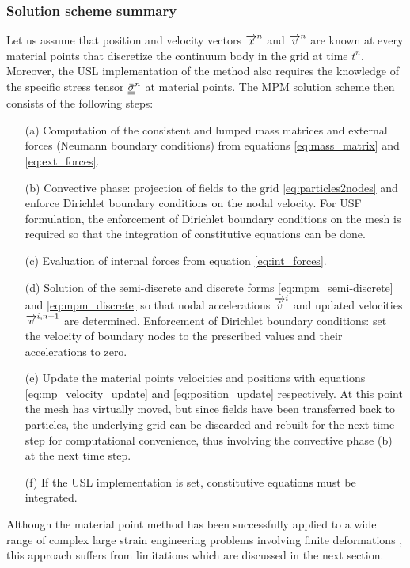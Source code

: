 \subsubsection{Solution scheme summary}
Let us assume that position and velocity vectors  ${\overrightarrow{x}}^n$ and ${\overrightarrow{v}}^n$ are known at every material points that discretize the continuum body in the grid at time $t^n$. Moreover, the USL implementation of the method also requires the knowledge of the specific stress tensor ${\underline{\underline{\bar{\sigma}}}}^n$ at material points. The MPM solution scheme then consists of the following steps:
\begin{itemize}
\item[(a)] Computation of the consistent and lumped mass matrices and external forces (Neumann boundary conditions) from equations \eqref{eq:mass_matrix} and \eqref{eq:ext_forces}.
\item[(b)] Convective phase: projection of fields to the grid \eqref{eq:particles2nodes} and enforce Dirichlet boundary conditions on the nodal velocity. For USF formulation, the enforcement of Dirichlet boundary conditions on the mesh is required so that the integration of constitutive equations can be done.
\item[(c)] Evaluation of internal forces from equation \eqref{eq:int_forces}.
\item[(d)] Solution of the semi-discrete and discrete forms \eqref{eq:mpm_semi-discrete} and \eqref{eq:mpm_discrete} so that nodal accelerations ${\overrightarrow{\dot{v}}}^i$ and updated velocities ${\overrightarrow{v}}^{i,n+1}$ are determined. Enforcement of Dirichlet boundary conditions: set the velocity of boundary nodes to the prescribed values and their accelerations to zero.
\item[(e)] Update the material points velocities and positions with equations \eqref{eq:mp_velocity_update} and \eqref{eq:position_update} respectively. At this point the mesh has virtually moved, but since fields have been transferred back to particles, the underlying grid can be discarded and rebuilt for the next time step for computational convenience, thus involving the convective phase (b) at the next time step. 
\item[(f)] If the USL implementation is set, constitutive equations must be integrated.
\end{itemize}

Although the material point method has been successfully applied to a wide range of complex large strain engineering problems involving finite deformations \cite{Wieckowski}, this approach suffers from limitations which are discussed in the next section. 

